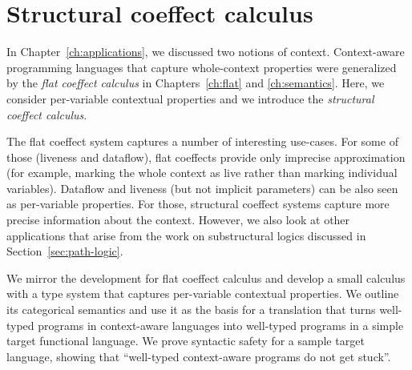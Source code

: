 \chapter{Structural coeffect calculus}
\label{ch:structural}

In Chapter~\ref{ch:applications}, we discussed two notions of context. Context-aware programming
languages that capture whole-context properties were generalized by the \emph{flat coeffect
calculus} in Chapters~\ref{ch:flat} and \ref{ch:semantics}. Here, we consider per-variable
contextual properties and we introduce the \emph{structural coeffect calculus}.

The flat coeffect system captures a number of interesting use-cases. For some of those (liveness
and dataflow), flat coeffects provide only imprecise approximation (for example, marking the whole
context as live rather than marking individual variables). Dataflow and liveness (but not implicit
parameters) can be also seen as per-variable properties. For those, structural coeffect systems
capture more precise information about the context. However, we also look at other applications
that arise from the work on substructural logics discussed in Section~\ref{sec:path-logic}.

We mirror the development for flat coeffect calculus and develop a small calculus with a type system
that captures per-variable contextual properties. We outline its categorical semantics and use it as
the basis for a translation that turns well-typed programs in context-aware languages into well-typed
programs in a simple target functional language. We prove syntactic safety for a sample target
language, showing that ``well-typed context-aware programs do not get stuck''.

